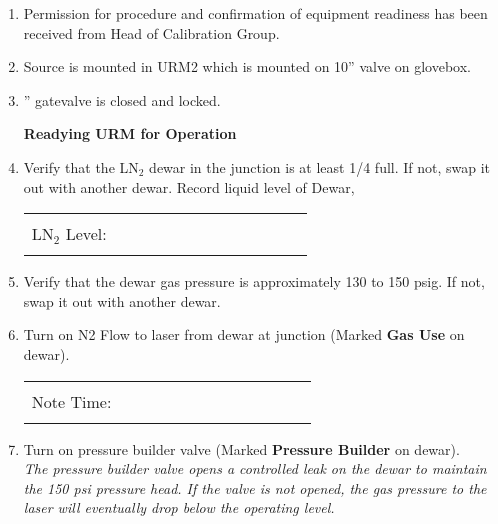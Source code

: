 \begin{enumerate}
\item\checkbox Permission for procedure and confirmation of equipment readiness
  has been received from Head of Calibration Group.

\item\checkbox Source is mounted in URM2 which is
  mounted on 10'' valve on glovebox.

\item{}'' gatevalve is closed and locked.



\begin{center}
                  {\bf Readying URM for Operation}
\end{center}

\item\checkbox Verify that the LN$_2$ dewar in the junction is
  at least 1/4 full.  If not, swap it out with another dewar.
  Record liquid level of Dewar,
     \begin{center}
     \begin{tabular}{|l|}
     \hline
      \\
     LN$_2$ Level:~~~~~~~~~~~~~~~~~~~~~~~~\\
      \\
     \hline
     \end{tabular}
     \end{center}

\item\checkbox Verify that the dewar gas pressure is approximately
  130 to 150 psig. If not, swap it out with another dewar.

\item\checkbox Turn on N2 Flow to laser from dewar at junction
  (Marked {\bf Gas Use} on dewar).
     \begin{center}
     \begin{tabular}{|l|}
     \hline
      \\
     Note Time:~~~~~~~~~~~~~~~~~~~~~~~~\\
      \\
     \hline
     \end{tabular}
     \end{center}

\item\checkbox Turn on pressure builder valve (Marked {\bf Pressure Builder}
  on dewar).\\
  \small
  {\em The pressure builder valve opens a controlled leak on the dewar
       to maintain the 150 psi pressure head.  If the valve is not
       opened, the gas pressure to the laser will eventually
       drop below the operating level.}
  \normalsize



\end{enumerate}
